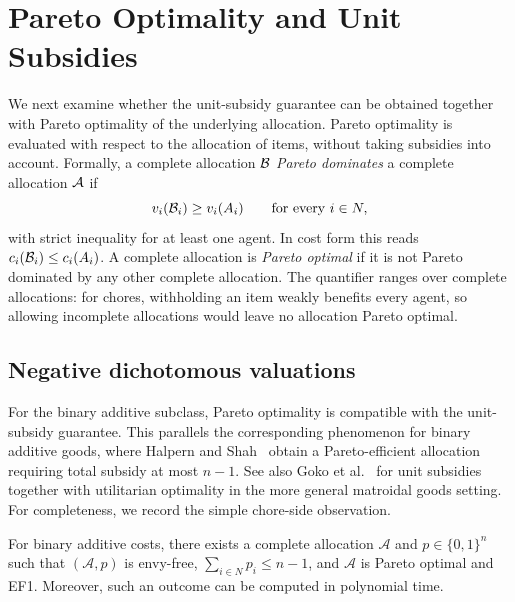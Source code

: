 \section{Pareto Optimality and Unit Subsidies}
\label{sec:pareto}

We next examine whether the unit-subsidy guarantee can be obtained together with
Pareto optimality of the underlying allocation. Pareto optimality is evaluated
with respect to the allocation of items, without taking subsidies into account.
Formally, a complete allocation $\mathcal{B}$ \emph{Pareto dominates} a complete
allocation $\mathcal{A}$ if
\[
  v_i(\mathcal{B}_i)\geq v_i(A_{i})
  \qquad\text{for every }i\in N,
\]
with strict inequality for at least one agent. In cost form this reads
$c_i(\mathcal{B}_i)\leq c_i(A_{i})$. A complete allocation is
\emph{Pareto optimal} if it is not Pareto dominated by any other complete
allocation. The quantifier ranges over complete allocations: for chores,
withholding an item weakly benefits every agent, so allowing incomplete
allocations would leave no allocation Pareto optimal.

\subsection{Negative dichotomous valuations}
\label{sec:pareto-chores}

For the binary additive subclass, Pareto optimality is compatible with the
unit-subsidy guarantee. This parallels the corresponding phenomenon for binary
additive goods, where Halpern and Shah~\cite{HS19} obtain a Pareto-efficient
allocation requiring total subsidy at most $n-1$. See also Goko et
al.~\cite{goko2024fair} for unit subsidies together with utilitarian optimality
in the more general matroidal goods setting. For completeness, we record the
simple chore-side observation.

\begin{proposition}
\label{prop:additive-po}
For binary additive costs, there exists a complete allocation $\mathcal A$ and
$p\in\{0,1\}^n$ such that $(\mathcal A,p)$ is envy-free,
$\sum_{i\in N}p_i\le n-1$, and $\mathcal A$ is Pareto optimal and EF1. Moreover,
such an outcome can be computed in polynomial time.
\end{proposition}

